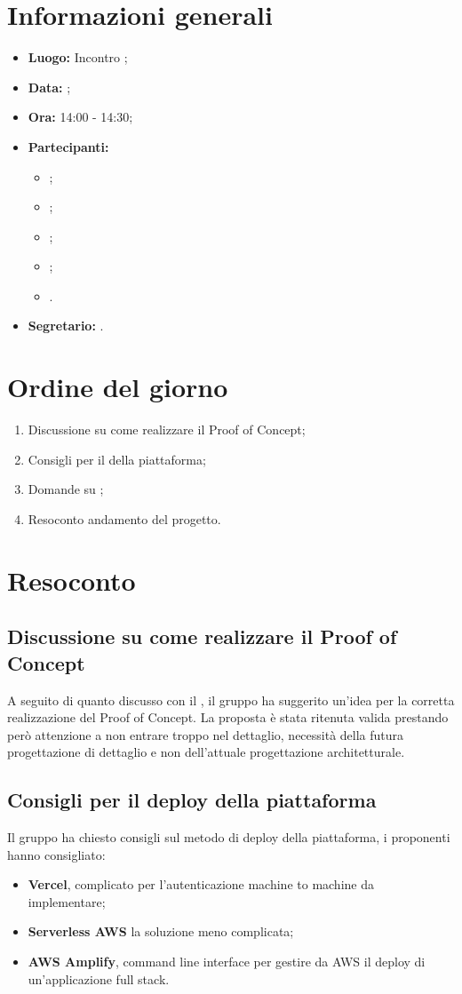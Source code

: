 \section{Informazioni generali}
\begin{itemize}
\item \textbf{Luogo:} Incontro ;
\item \textbf{Data:} \Data;
\item \textbf{Ora:} 14:00 - 14:30;
\item \textbf{Partecipanti:}
	\begin{itemize}
		\item \BL{}; 
		\item \FF{};
		\item \TG{};
		\item \TL{};
		\item \Proponente{}.
	\end{itemize}
\item \textbf{Segretario:} \TG{}.
\end{itemize}

\section{Ordine del giorno}
\begin{enumerate}
	\item Discussione su come realizzare il Proof of Concept;
	\item Consigli per il  della piattaforma;
	\item Domande su ;
	\item Resoconto andamento del progetto.
\end{enumerate}

\section{Resoconto}
\subsection{Discussione su come realizzare il Proof of Concept}
A seguito di quanto discusso con il \CR{}, il gruppo ha suggerito un'idea per la corretta realizzazione del Proof of Concept. La proposta è stata ritenuta valida prestando però attenzione a non entrare troppo nel dettaglio, necessità della futura progettazione di dettaglio e non dell'attuale progettazione architetturale.
\subsection{Consigli per il deploy della piattaforma}
Il gruppo ha chiesto consigli sul metodo di deploy della piattaforma, i proponenti hanno consigliato:
\begin{itemize}
	\item \textbf{Vercel}, complicato per l'autenticazione machine to machine da implementare;
	\item \textbf{Serverless AWS} la soluzione meno complicata;
	\item \textbf{AWS Amplify}, command line interface per gestire da AWS il deploy di un'applicazione full stack.
\end{itemize}
